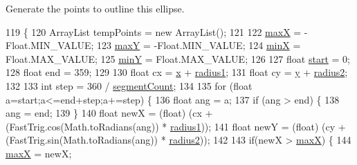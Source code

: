 Generate the points to outline this ellipse. 
\begin{DoxyCode}
119                                   \{
120         ArrayList tempPoints = \textcolor{keyword}{new} ArrayList();
121 
122         \mbox{\hyperlink{classorg_1_1newdawn_1_1slick_1_1geom_1_1_shape_a8c820b5a7df465beab7f021cdd09b826}{maxX}} = -Float.MIN\_VALUE;
123         \mbox{\hyperlink{classorg_1_1newdawn_1_1slick_1_1geom_1_1_shape_aaacbabfb1b7d0653f59658d92ded1c2b}{maxY}} = -Float.MIN\_VALUE;
124         \mbox{\hyperlink{classorg_1_1newdawn_1_1slick_1_1geom_1_1_shape_a5bd07629e85d4a15fc03e3d60edb7c03}{minX}} = Float.MAX\_VALUE;
125         \mbox{\hyperlink{classorg_1_1newdawn_1_1slick_1_1geom_1_1_shape_a4794592d5238a8c51d9d8ac4a11e68d4}{minY}} = Float.MAX\_VALUE;
126 
127         \textcolor{keywordtype}{float} \mbox{\hyperlink{namespaceejemplo_1_1clase_abcf43191f0ecf3b071ca2db7696ba821}{start}} = 0;
128         \textcolor{keywordtype}{float} end = 359;
129         
130         \textcolor{keywordtype}{float} cx = \mbox{\hyperlink{classorg_1_1newdawn_1_1slick_1_1geom_1_1_shape_a3e985bfff386c15a4efaad03d8ad60d3}{x}} + \mbox{\hyperlink{classorg_1_1newdawn_1_1slick_1_1geom_1_1_ellipse_a26f6d13c3b22a475bc1caf33f84a24b9}{radius1}};
131         \textcolor{keywordtype}{float} cy = \mbox{\hyperlink{classorg_1_1newdawn_1_1slick_1_1geom_1_1_shape_a9f934baded6a1b65ebb69e7e5f80ea00}{y}} + \mbox{\hyperlink{classorg_1_1newdawn_1_1slick_1_1geom_1_1_ellipse_ad3152cb17acd020ac3ae7bf70526ae9f}{radius2}};
132         
133         \textcolor{keywordtype}{int} step = 360 / \mbox{\hyperlink{classorg_1_1newdawn_1_1slick_1_1geom_1_1_ellipse_a08f529daee51987987eda5f422abdd31}{segmentCount}};
134         
135         \textcolor{keywordflow}{for} (\textcolor{keywordtype}{float} a=start;a<=end+step;a+=step) \{
136             \textcolor{keywordtype}{float} ang = a;
137             \textcolor{keywordflow}{if} (ang > end) \{
138                 ang = end;
139             \}
140             \textcolor{keywordtype}{float} newX = (float) (cx + (FastTrig.cos(Math.toRadians(ang)) * 
      \mbox{\hyperlink{classorg_1_1newdawn_1_1slick_1_1geom_1_1_ellipse_a26f6d13c3b22a475bc1caf33f84a24b9}{radius1}}));
141             \textcolor{keywordtype}{float} newY = (float) (cy + (FastTrig.sin(Math.toRadians(ang)) * 
      \mbox{\hyperlink{classorg_1_1newdawn_1_1slick_1_1geom_1_1_ellipse_ad3152cb17acd020ac3ae7bf70526ae9f}{radius2}}));
142 
143             \textcolor{keywordflow}{if}(newX > \mbox{\hyperlink{classorg_1_1newdawn_1_1slick_1_1geom_1_1_shape_a8c820b5a7df465beab7f021cdd09b826}{maxX}}) \{
144                 \mbox{\hyperlink{classorg_1_1newdawn_1_1slick_1_1geom_1_1_shape_a8c820b5a7df465beab7f021cdd09b826}{maxX}} = newX;

\end{DoxyCode}
